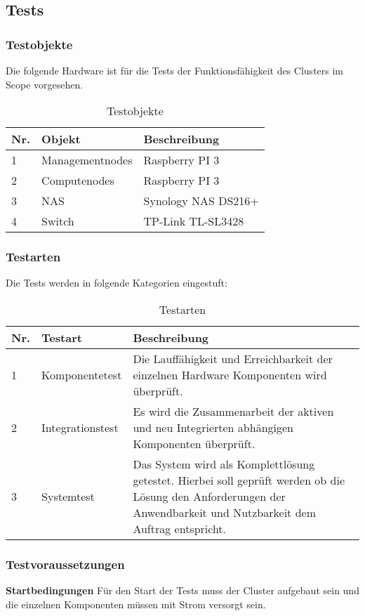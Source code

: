 \subsection{Tests}
\subsubsection{Testobjekte}
Die folgende Hardware ist für die Tests der Funktionsfähigkeit des Clusters im Scope vorgesehen.
\begin{table}[H]
\centering
\begin{tabular}{p{1cm}p{}p{7.5cm}}
\hline
\rowcolor{heading} \textbf{Nr.} & \textbf{Objekt} & \textbf{Beschreibung} \\\hline
1 & Managementnodes & Raspberry PI 3  \\\hline
2 & Computenodes & Raspberry PI 3 \\\hline
3 & NAS & Synology NAS DS216+ \\\hline
4 & Switch & TP-Link TL-SL3428 \\\hline
\end{tabular}
\caption{Testobjekte}
\end{table}

\subsubsection{Testarten}
Die Tests werden in folgende Kategorien eingestuft:

\begin{table}[H]
\centering
\begin{tabular}{p{1cm}p{3cm}p{12cm}}
\hline
\rowcolor{heading} \textbf{Nr.} & \textbf{Testart} & \textbf{Beschreibung} \\\hline
1 & Komponentetest & Die Lauffähigkeit und Erreichbarkeit der einzelnen Hardware Komponenten wird überprüft.  \\\hline
2 & Integrationstest & Es wird die Zusammenarbeit der aktiven und neu Integrierten abhängigen Komponenten überprüft. \\\hline
3 & Systemtest & Das System wird als Komplettlösung getestet. Hierbei soll geprüft werden ob die Lösung den Anforderungen der Anwendbarkeit und Nutzbarkeit dem Auftrag entspricht.  \\\hline
\end{tabular}
\caption{Testarten}
\end{table}

\subsubsection{Testvoraussetzungen}
\textbf{Startbedingungen}\newline
Für den Start der Tests muss der Cluster aufgebaut sein und die einzelnen Komponenten müssen mit Strom versorgt sein. 

